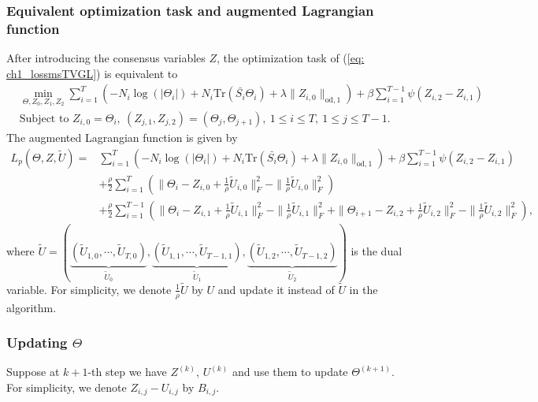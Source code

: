 \subsubsection{Equivalent optimization task and augmented Lagrangian function}
After introducing the consensus variables $Z$, the optimization task of (\ref{eq: ch1_lossmsTVGL}) is equivalent to
\begin{align*}
    & \min_{\Theta, Z_0, Z_1, Z_2}\sum_{i=1}^{T}\left(-N_i\log(|\Theta_i|)+N_i\text{Tr}(\bar{S_i}\Theta_i) + \lambda\|Z_{i,0}\|_{\text{od}, 1}\right) + \beta\sum_{i=1}^{T-1}\psi(Z_{i,2}-Z_{i,1}) \\
    & \text{Subject to } Z_{i,0}=\Theta_i,\ (Z_{j,1}, Z_{j,2})=(\Theta_j,\Theta_{j+1}),\ 1\leq i\leq T,\ 1\leq j\leq T-1.
\end{align*}
The augmented Lagrangian function is given by 
\begin{align*}
    L_p(\Theta,Z,\tilde{U}) =& \sum_{i=1}^{T}\left(-N_i\log(|\Theta_i|)+N_i\text{Tr}(\bar{S_i}\Theta_i) + \lambda\|Z_{i,0}\|_{\text{od}, 1}\right) + \beta\sum_{i=1}^{T-1}\psi(Z_{i,2}-Z_{i,1}) \\
                                  &+ \frac{\rho}{2}\sum_{i=1}^{T}(\|\Theta_i-Z_{i,0}+\frac{1}{\rho}\tilde{U}_{i,0}\|_F^2-\|\frac{1}{\rho}\tilde{U}_{i,0}\|_F^2) \\
                                  &+ \frac{\rho}{2}\sum_{i=1}^{T-1}(\|\Theta_{i}-Z_{i,1}+\frac{1}{\rho}\tilde{U}_{i,1}\|_F^2-\|\frac{1}{\rho}\tilde{U}_{i,1}\|_F^2+\|\Theta_{i+1}-Z_{i,2}+\frac{1}{\rho}\tilde{U}_{i,2}\|_F^2-\|\frac{1}{\rho}\tilde{U}_{i,2}\|_F^2), 
\end{align*}
where $\tilde{U}=(\underbrace{(\tilde{U}_{1,0},\cdots,\tilde{U}_{T,0})}_{\tilde{U}_0},\underbrace{(\tilde{U}_{1,1},\cdots,\tilde{U}_{T-1,1})}_{\tilde{U}_1},\underbrace{(\tilde{U}_{1,2},\cdots,\tilde{U}_{T-1,2})}_{\tilde{U}_2})$
is the dual variable.
For simplicity, we denote $\frac{1}{\rho}\tilde{U}$ by $U$ and update it instead of $\tilde{U}$ in the algorithm.

\subsubsection{Updating $\Theta$}

Suppose at $k+1$-th step we have $Z^{(k)}$, $U^{(k)}$ and use them to update $\Theta^{(k+1)}$.
For simplicity, we denote $Z_{i,j}-U_{i,j}$ by $B_{i,j}$.

